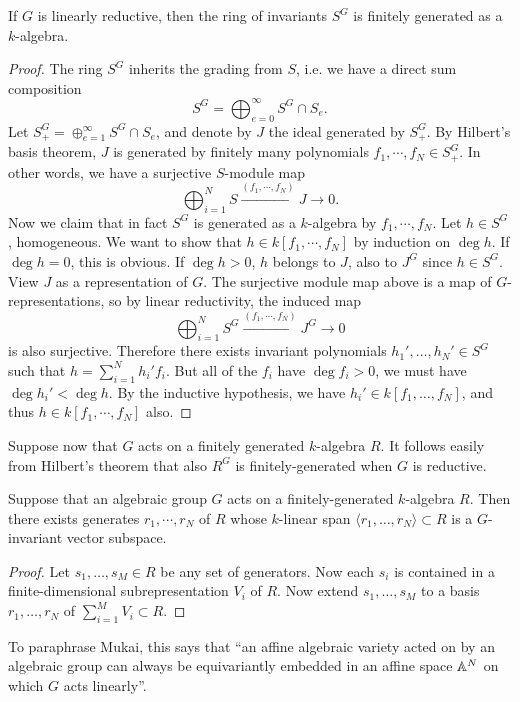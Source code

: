 \documentclass[11pt, english]{article}
\begin{document}
\begin{thm}[Hilbert]
If $G$ is linearly reductive, then the ring of invariants $S^G$ is finitely generated as a $k$-algebra.
\end{thm}
\begin{proof}
The ring $S^G$ inherits the grading from $S$, i.e. we have a direct sum composition
$$
S^G = \bigoplus_{e=0}^\infty S^G \cap S_e.
$$
Let $S_+^G = \oplus_{e=1}^\infty S^G \cap S_e$, and denote by $J$ the ideal generated by $S_+^G$. By Hilbert's basis theorem, $J$ is generated by finitely many polynomials $f_1,\cdots,f_N \in S_+^G$. In other words, we have a surjective $S$-module map
$$
\bigoplus_{i=1}^N S \xrightarrow{(f_1,\cdots,f_N)} J \to 0.
$$
Now we claim that in fact $S^G$ is generated as a $k$-algebra by $f_1,\cdots,f_N$. Let $h \in S^G$, homogeneous. We want to show that $h \in k[f_1,\cdots,f_N]$ by induction on $\deg h$. If $\deg h = 0$, this is obvious. If $\deg h> 0$, $h$ belongs to $J$, also to $J^G$ since $h \in S^G$. View $J$ as a representation of $G$. The surjective module map above is a map of $G$-representations, so by linear reductivity, the induced map
$$
\bigoplus_{i=1}^N S^G \xrightarrow{(f_1,\cdots,f_N)} J^G \to 0
$$
is also surjective. Therefore there exists invariant polynomials $h_1',\ldots,h_N' \in S^G$ such that $h= \sum_{i=1}^N h_i' f_i$. But all of the $f_i$ have $\deg f_i > 0$, we must have $\deg h_i' < \deg h$. By the inductive hypothesis, we have $h_i' \in k[f_1,\ldots,f_N]$, and thus $h \in k[f_1,\cdots,f_N]$ also.
\end{proof}
 
Suppose now that $G$ acts on a finitely generated $k$-algebra $R$. It follows easily from Hilbert's theorem that also $R^G$ is finitely-generated when $G$ is reductive.

\begin{lemma}
 Suppose that an algebraic group $G$ acts on a finitely-generated $k$-algebra $R$. Then there exists generates $r_1,\cdots,r_N$ of $R$ whose $k$-linear span $\langle r_1,\ldots, r_N \rangle \subset R$ is a $G$-invariant vector subspace.
\end{lemma}
\begin{proof}
Let $s_1,\ldots,s_M \in R$ be any set of generators. Now each $s_i$ is contained in a finite-dimensional subrepresentation $V_i$ of $R$. Now extend $s_1,\ldots, s_M$ to a basis $r_1,\ldots, r_N$ of $\sum_{i=1}^M V_i \subset R$.
\end{proof}

To paraphrase Mukai, this says that ``an affine algebraic variety acted on by an algebraic group can always be equivariantly embedded in an affine space $\mathbb{A}^N$ on which $G$ acts linearly''.
\end{document}
